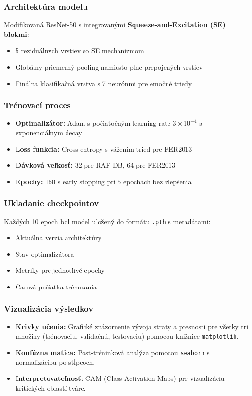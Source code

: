 \subsubsection{Architektúra modelu}
Modifikovaná ResNet-50 s integrovanými \textbf{Squeeze-and-Excitation (SE) blokmi}:
\begin{itemize}
    \item 5 reziduálnych vrstiev so SE mechanizmom
    \item Globálny priemerný pooling namiesto plne prepojených vrstiev
    \item Finálna klasifikačná vrstva s 7 neurónmi pre emočné triedy
\end{itemize}

\subsubsection{Trénovací proces}
\begin{itemize}
    \item \textbf{Optimalizátor:} Adam s počiatočným learning rate $3 \times 10^{-4}$ a exponenciálnym decay
    \item \textbf{Loss funkcia:} Cross-entropy s vážením tried pre FER2013
    \item \textbf{Dávková veľkosť:} 32 pre RAF-DB, 64 pre FER2013
    \item \textbf{Epochy:} 150 s early stopping pri 5 epochách bez zlepšenia
\end{itemize}

\subsubsection{Ukladanie checkpointov}
Každých 10 epoch bol model uložený do formátu \texttt{.pth} s metadátami:
\begin{itemize}
    \item Aktuálna verzia architektúry
    \item Stav optimalizátora
    \item Metriky pre jednotlivé epochy
    \item Časová pečiatka trénovania
\end{itemize}

\subsubsection{Vizualizácia výsledkov}
\begin{itemize}
    \item \textbf{Krivky učenia:} Grafické znázornenie vývoja straty a presnosti pre všetky tri množiny (trénovaciu, validačnú, testovaciu) pomocou knižnice \texttt{matplotlib}.
    \item \textbf{Konfúzna matica:} Post-tréninková analýza pomocou \texttt{seaborn} s normalizáciou po stĺpcoch.
    \item \textbf{Interpretovateľnosť:} CAM (Class Activation Maps) pre vizualizáciu kritických oblastí tváre.
\end{itemize}

